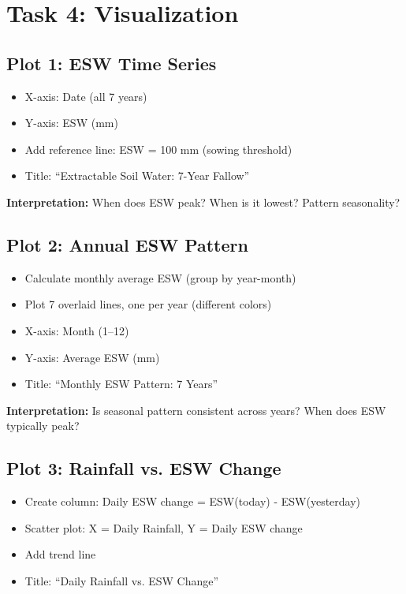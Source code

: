 \section{Task 4: Visualization}

\subsection{Plot 1: ESW Time Series}

\begin{itemize}
  \item X-axis: Date (all 7 years)
  \item Y-axis: ESW (mm)
  \item Add reference line: ESW = 100 mm (sowing threshold)
  \item Title: ``Extractable Soil Water: 7-Year Fallow''
\end{itemize}

\textbf{Interpretation:} When does ESW peak? When is it lowest? Pattern seasonality?

\subsection{Plot 2: Annual ESW Pattern}

\begin{itemize}
  \item Calculate monthly average ESW (group by year-month)
  \item Plot 7 overlaid lines, one per year (different colors)
  \item X-axis: Month (1--12)
  \item Y-axis: Average ESW (mm)
  \item Title: ``Monthly ESW Pattern: 7 Years''
\end{itemize}

\textbf{Interpretation:} Is seasonal pattern consistent across years? When does ESW typically peak?

\subsection{Plot 3: Rainfall vs. ESW Change}

\begin{itemize}
  \item Create column: Daily ESW change = ESW(today) - ESW(yesterday)
  \item Scatter plot: X = Daily Rainfall, Y = Daily ESW change
  \item Add trend line
  \item Title: ``Daily Rainfall vs. ESW Change''
\end{itemize}

